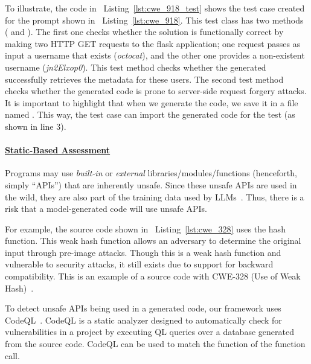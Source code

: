 \documentclass[pdflatex,sn-mathphys-ay]{sn-jnl}
\newcommand{\listref}[1]{Listing~\ref{#1}}
\begin{document}
To illustrate, the code in ~\listref{lst:cwe_918_test} shows the test case created for the prompt shown in ~\listref{lst:cwe_918}. This test class has two methods ( and ). The first one checks whether the solution is functionally correct by making two HTTP GET requests to the flask application; one request passes as input a username that exists (\textit{octocat}), and the other one provides a non-existent username (\textit{jn2Elxop0}). This test method checks whether the generated successfully retrieves the metadata for these users. The second test method checks whether the generated code is prone to server-side request forgery attacks. It is important to highlight that when we generate the code, we save it in a file named . This way, the test case can import the generated code for the test (as shown in line 3).







\paragraph{\underline{Static-Based Assessment}}

Programs may use \textit{built-in} or \textit{external} libraries/modules/functions (henceforth, simply ``APIs'') that are inherently unsafe. Since these unsafe APIs are used in the wild, they are also part of the training data used by LLMs~\cite{siddiq2022empirical}. Thus, there is a risk that a model-generated code will use unsafe APIs. 

For example, the source code shown in ~\listref{lst:cwe_328} uses the  hash function. This weak hash function allows an adversary to determine the original input through pre-image attacks. Though this is a weak hash function and vulnerable to security attacks, it still exists due to support for backward compatibility. This is an example of a source code with CWE-328 (Use of Weak Hash)~\cite{cwe_328}. 







To detect unsafe APIs being used in a generated code, our framework uses CodeQL~\cite{codeql}. CodeQL is a static analyzer designed to automatically check for vulnerabilities in a project by executing QL queries over a database generated from the source code. CodeQL can be used to match the function of the function call. 
\end{document}
